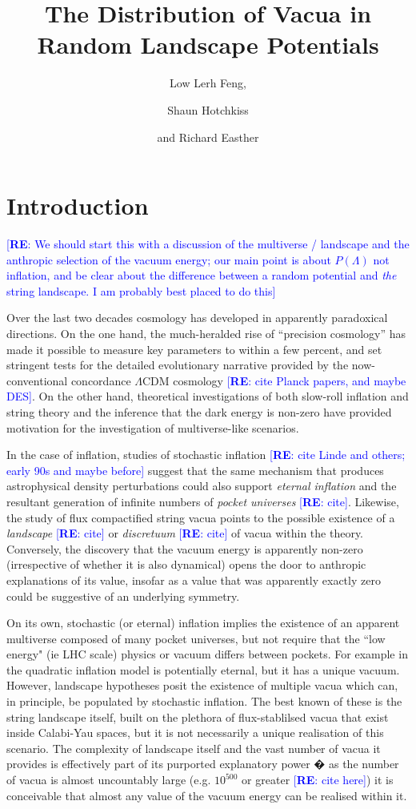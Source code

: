 \documentclass[12pt]{article}
\title{The Distribution of Vacua in Random Landscape Potentials}
\author{Low Lerh Feng,}
\author{Shaun Hotchkiss}
\author{and Richard Easther}
\affiliation{Department of Physics,\\ University of Auckland, \\Private Bag 92019,\\ Auckland, New Zealand}
\newcommand{\re}[1]{\textcolor{blue}{[{\bf RE}: #1]}}
\begin{document}
\maketitle

\section{Introduction}

\re{We should start this with a discussion of the multiverse / landscape and the anthropic selection of the vacuum energy; our main point is about $P(\Lambda)$ not inflation, and be clear about the difference between a random potential and {\em the} string landscape. I am probably best placed to do this} 

Over the last two decades cosmology has developed in apparently paradoxical directions. On the one hand, the much-heralded rise of ``precision cosmology'' has made it possible to measure key parameters to within a few percent, and set stringent tests for the detailed evolutionary narrative provided by the now-conventional concordance $\Lambda$CDM cosmology\cite{Planck2018}\cite{DES} \re{cite Planck papers, and maybe DES}. On the other hand, theoretical investigations of both slow-roll inflation and string theory and the inference that the dark energy is non-zero have  provided motivation for the investigation of multiverse-like scenarios. 

In the case of inflation, studies of stochastic inflation \re{cite Linde and others; early 90s and maybe before}  suggest that the same mechanism that produces astrophysical density perturbations could also support {\em eternal inflation\/} and the resultant generation of infinite numbers of  {\em pocket universes\/} \re{cite}. Likewise, the study of flux compactified string vacua points to the possible existence of a {\em landscape\/} \re{cite} or {\em discretuum\/} \re{cite}  \cite{Guth2001} of vacua within the theory. Conversely, the discovery that the vacuum energy is apparently non-zero (irrespective of whether it is also dynamical) opens the door to anthropic explanations of its value, insofar as a value that was apparently exactly zero could be suggestive of an underlying symmetry. 

 On its own, stochastic (or eternal) inflation  implies the existence of an apparent multiverse composed of many pocket universes, but not require that the ``low energy" (ie LHC scale) physics or vacuum  differs between pockets. For example in the quadratic inflation model is potentially eternal, but it has a unique vacuum.  However, landscape hypotheses posit the existence of multiple vacua which can, in principle, be populated by stochastic inflation. The best known of these is the string landscape itself, built on the plethora of flux-stablilsed vacua that exist inside Calabi-Yau spaces, but it is not necessarily a unique realisation of this scenario. The complexity of landscape itself and the vast number of vacua it provides is effectively part of its purported explanatory power � as the number of vacua is almost uncountably large (e.g. $10^{500}$ or greater \cite{Douglas}\re{cite here}) it is conceivable that almost any value of the vacuum energy can be realised within it. 
 
\end{document}
